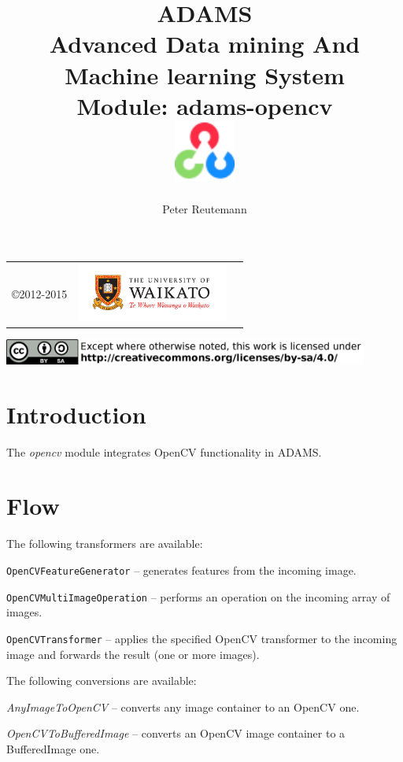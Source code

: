 \documentclass[a4paper]{book}
\title{
  \textbf{ADAMS} \\
  {\Large \textbf{A}dvanced \textbf{D}ata mining \textbf{A}nd \textbf{M}achine
  learning \textbf{S}ystem} \\
  {\Large Module: adams-opencv} \\
  \vspace{1cm}
  \includegraphics[width=2cm]{images/opencv-module.png} \\
}
\author{
  Peter Reutemann
}
\begin{document}
\begin{titlepage}
\maketitle

\thispagestyle{empty}
\center
\begin{table}[b]
	\begin{tabular}{c l l}
		\parbox[c][2cm]{2cm}{\copyright 2012-2015} &
		\parbox[c][2cm]{5cm}{\includegraphics[width=5cm]{images/coat_of_arms.pdf}} \\
	\end{tabular}
	\includegraphics[width=12cm]{images/cc.png} \\
\end{table}

\end{titlepage}

\tableofcontents
\listoffigures

\chapter{Introduction}
The \textit{opencv} module integrates OpenCV functionality \cite{opencv} in ADAMS.

\chapter{Flow}
The following transformers are available:
\begin{tight_itemize}
  \item \texttt{OpenCVFeatureGenerator} -- generates features from the incoming image.
  \item \texttt{OpenCVMultiImageOperation} -- performs an operation on the incoming array of images.
  \item \texttt{OpenCVTransformer} -- applies the specified OpenCV transformer to the incoming image and
  forwards the result (one or more images).
\end{tight_itemize}
The following conversions are available:
\begin{tight_itemize}
  \item \textit{AnyImageToOpenCV} -- converts any image container to an OpenCV one.
  \item \textit{OpenCVToBufferedImage} -- converts an OpenCV image container to a BufferedImage one.
\end{tight_itemize}


\end{document}
